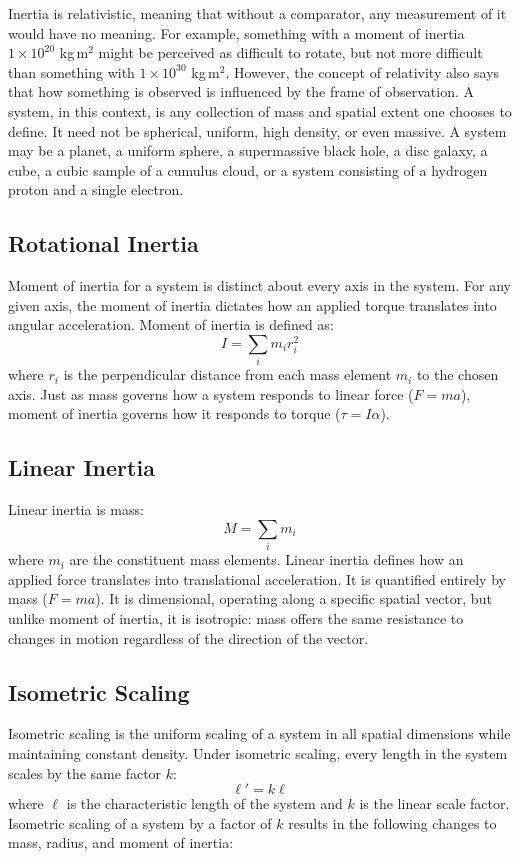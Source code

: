 \documentclass[twoside,twocolumn,9pt]{article}
\begin{document}
Inertia is relativistic, meaning that without a comparator, any measurement of it would have no meaning. For example, something with a moment of inertia $1 \times 10^{20}$ kg\,m$^2$ might be perceived as difficult to rotate, but not more difficult than something with $1 \times 10^{30}$ kg\,m$^2$. However, the concept of relativity also says that how something is observed is influenced by the frame of observation.
A system, in this context, is any collection of mass and spatial extent one chooses to define. It need not be spherical, uniform, high density, or even massive. A system may be a planet, a uniform sphere, a supermassive black hole, a disc galaxy, a cube, a cubic sample of a cumulus cloud, or a system consisting of a hydrogen proton and a single electron.

\subsection{Rotational Inertia}
Moment of inertia for a system is distinct about every axis in the system. For any given axis, the moment of inertia dictates how an applied torque translates into angular acceleration. Moment of inertia is defined as:
\begin{equation} \label{eq:moi}
I = \sum_i m_i r_i^2
\end{equation}
where $r_i$ is the perpendicular distance from each mass element $m_i$ to the chosen axis. Just as mass governs how a system responds to linear force ($F = ma$), moment of inertia governs how it responds to torque ($\tau = I\alpha$).

\subsection{Linear Inertia}
Linear inertia is mass:
\begin{equation} \label{eq:mass}
M = \sum_i m_i
\end{equation}
where $m_i$ are the constituent mass elements. Linear inertia defines how an applied force translates into translational acceleration. It is quantified entirely by mass ($F = ma$). It is dimensional, operating along a specific spatial vector, but unlike moment of inertia, it is isotropic: mass offers the same resistance to changes in motion regardless of the direction of the vector.

\subsection{Isometric Scaling}
Isometric scaling is the uniform scaling of a system in all spatial dimensions while maintaining constant density. Under isometric scaling, every length in the system scales by the same factor $k$:
\begin{equation} \label{eq:length_scaling}
\ell' = k\ell
\end{equation}
where $\ell$ is the characteristic length of the system and $k$ is the linear scale factor. Isometric scaling of a system by a factor of $k$ results in the following changes to mass, radius, and moment of inertia:
\end{document}
